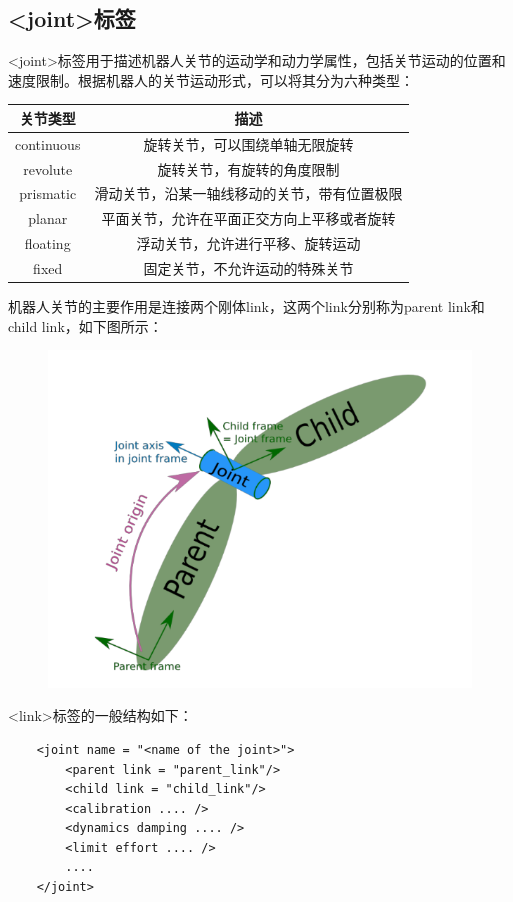 \documentclass[9pt, oneside]{book}
\begin{document}
\subsection{<joint>标签}\label{subsec:joint}

<joint>标签用于描述机器人关节的运动学和动力学属性，包括关节运动的位置和速度限制。根据机器人的关节运动形式，可以将其分为六种类型：

\begin{table}[H]
    \centering
    \begin{tabular}{c|c}
    \hline
    \textbf{关节类型} & \textbf{描述}            \\ \hline
    continuous    & 旋转关节，可以围绕单轴无限旋转        \\ \hline
    revolute      & 旋转关节，有旋转的角度限制          \\ \hline
    prismatic     & 滑动关节，沿某一轴线移动的关节，带有位置极限 \\ \hline
    planar        & 平面关节，允许在平面正交方向上平移或者旋转  \\ \hline
    floating      & 浮动关节，允许进行平移、旋转运动       \\ \hline
    fixed         & 固定关节，不允许运动的特殊关节        \\ \hline
    \end{tabular}
\end{table}

机器人关节的主要作用是连接两个刚体link，这两个link分别称为parent link和child link，如下图所示：

\begin{figure}[H]
    \centering
    \includegraphics[width = 0.5\linewidth]{image/joint标签.png}
\end{figure}

<link>标签的一般结构如下：

\begin{verbatim}
    <joint name = "<name of the joint>">
        <parent link = "parent_link"/>
        <child link = "child_link"/>
        <calibration .... />
        <dynamics damping .... />
        <limit effort .... />
        ....
    </joint>
\end{verbatim}
\end{document}
